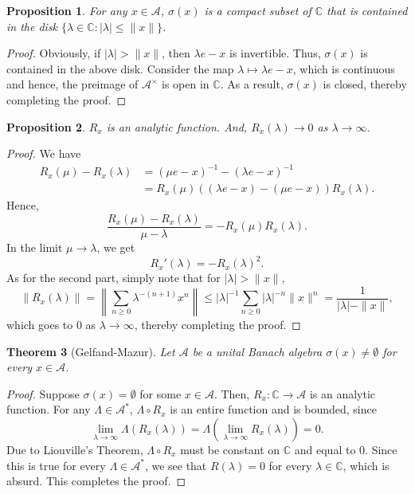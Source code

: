 \documentclass[12pt]{article}
\theoremstyle{thmstyle}
\newtheorem{theorem}{Theorem}[section]
\newtheorem{proposition}[theorem]{Proposition}
\theoremstyle{defstyle}
\newcommand{\bbC}{\mathbb{C}}
\newcommand{\calA}{\mathcal{A}} %
\renewcommand{\le}{\leqslant}
\renewcommand{\ge}{\geqslant}
\begin{document}
\begin{proposition}
    For any $x\in\calA$, $\sigma(x)$ is a compact subset of $\bbC$ that is contained in the disk $\{\lambda\in\bbC\colon |\lambda|\le \|x\|\}$.
\end{proposition}
\begin{proof}
    Obviously, if $|\lambda| > \|x\|$, then $\lambda e - x$ is invertible. Thus, $\sigma(x)$ is contained in the above disk. Consider the map $\lambda\mapsto\lambda e - x$, which is continuous and hence, the preimage of $\calA^\times$ is open in $\bbC$. As a result, $\sigma(x)$ is closed, thereby completing the proof.
\end{proof}

\begin{proposition}
    $R_x$ is an analytic function. And, $R_x(\lambda)\to 0$ as $\lambda\to\infty$.
\end{proposition}
\begin{proof}
    We have 
    \begin{align*}
        R_x(\mu) - R_x(\lambda) &= (\mu e - x)^{-1} - (\lambda e - x)^{-1}\\
        &= R_x(\mu)\left((\lambda e - x) - (\mu e - x)\right)R_x(\lambda).
    \end{align*}
    Hence, 
    \begin{equation*}
        \frac{R_x(\mu) - R_x(\lambda)}{\mu - \lambda} = -R_x(\mu)R_x(\lambda).
    \end{equation*}
    In the limit $\mu\to\lambda$, we get 
    \begin{equation*}
        R_x'(\lambda) = - R_x(\lambda)^2.
    \end{equation*}
    As for the second part, simply note that for $|\lambda| > \|x\|$, 
    \begin{equation*}
        \|R_x(\lambda)\| = \left\|\sum_{n\ge 0}\lambda^{-(n + 1)}x^{n}\right\|\le|\lambda|^{-1}\sum_{n\ge 0}|\lambda|^{-n}\|x\|^n = \frac{1}{|\lambda| - \|x\|},
    \end{equation*}
    which goes to $0$ as $\lambda\to\infty$, thereby completing the proof.
\end{proof}

\begin{theorem}[Gelfand-Mazur]
    Let $\calA$ be a unital Banach algebra $\sigma(x)\ne\emptyset$ for every $x\in\calA$.
\end{theorem}
\begin{proof}
    Suppose $\sigma(x) = \emptyset$ for some $x\in\calA$. Then, $R_x:\bbC\to\calA$ is an analytic function. For any $\Lambda\in\calA^\ast$, $\Lambda\circ R_x$ is an entire function and is bounded, since 
    \begin{equation*}
        \lim_{\lambda\to\infty}\Lambda(R_x(\lambda)) = \Lambda\left(\lim_{\lambda\to\infty} R_x(\lambda)\right) = 0.
    \end{equation*}
    Due to Liouville's Theorem, $\Lambda\circ R_x$ must be constant on $\bbC$ and equal to $0$. Since this is true for every $\Lambda\in\calA^\ast$, we see that $R(\lambda) = 0$ for every $\lambda\in\bbC$, which is absurd. This completes the proof.
\end{proof}
\end{document}
